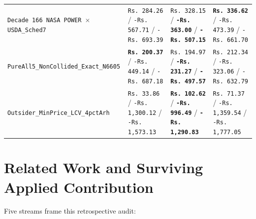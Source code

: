 \documentclass[11pt,a4paper]{article}
\begin{document}
\begin{table}[htbp]
{\begin{tabular}{llll}
\texttt{Decade 166 NASA POWER $\times$ USDA\_Sched7} & \texttt{Rs.\,284.26} / \texttt{-Rs.\,567.71} / \texttt{-Rs.\,693.39} & \texttt{Rs.\,328.15} / \textbf{\texttt{-Rs.\,363.00}} / \textbf{\texttt{-Rs.\,507.15}} & \textbf{\texttt{Rs.\,336.62}} / \texttt{-Rs.\,473.39} / \texttt{-Rs.\,661.70} \\
\texttt{PureAll5\_NonCollided\_Exact\_N6605} & \textbf{\texttt{Rs.\,200.37}} / \texttt{-Rs.\,449.14} / \texttt{-Rs.\,687.18} & \texttt{Rs.\,194.97} / \textbf{\texttt{-Rs.\,231.27}} / \textbf{\texttt{-Rs.\,497.57}} & \texttt{Rs.\,212.34} / \texttt{-Rs.\,323.06} / \texttt{-Rs.\,632.79} \\
\texttt{Outsider\_MinPrice\_LCV\_4pctArh} & \texttt{Rs.\,33.86} / \texttt{-Rs.\,1,300.12} / \texttt{-Rs.\,1,573.13} & \textbf{\texttt{Rs.\,102.62}} / \textbf{\texttt{-Rs.\,996.49}} / \textbf{\texttt{-Rs.\,1,290.83}} & \texttt{Rs.\,71.37} / \texttt{-Rs.\,1,359.54} / \texttt{-Rs.\,1,777.05} \\
\bottomrule
\end{tabular}}
\end{table}

\section{Related Work and Surviving Applied Contribution}

Five streams frame this retrospective audit:
\end{document}
